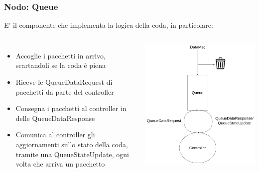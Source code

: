 \documentclass[compress]{beamer}
\begin{document}
\subsubsection*{Nodo: Queue}
\begin{frame}{\subsubsecname}
    E' il componente che implementa la logica della coda, in particolare:
    \vspace{0.5cm}
        \begin{columns}
                \begin{minipage}[b]{1\textwidth}
                    \begin{itemize}
                        \item Accoglie i pacchetti in arrivo, scartandoli se la coda è piena
                        \item Riceve le QueueDataRequest di pacchetti da parte del controller
                        \item Consegna i pacchetti al controller in delle QueueDataResponse
                        \item Comunica al controller gli aggiornamenti sullo stato della coda, tramite una QueueStateUpdate, ogni volta che arriva un pacchetto
                    \end{itemize}
                \end{minipage}
                \begin{minipage}{.9\textwidth}
                    \begin{adjustbox}{margin=0.5cm 0cm 0.1cm 0cm, center} %
                        \includegraphics[width=1\textwidth]{figs/queue_scheme.png}
                    \end{adjustbox}
                \end{minipage}
        \end{columns}
\end{frame}
\end{document}
